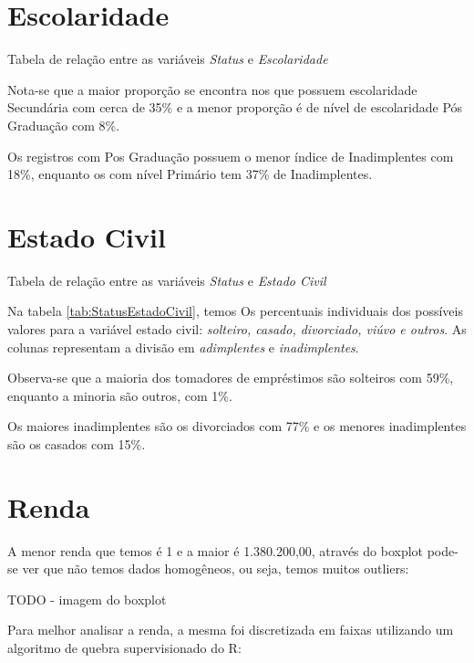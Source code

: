\section{Escolaridade}

\begin{table}[h]
\centering

\caption{\label{tab:StatusEscolaridade}Tabela de relação entre as variáveis \emph{Status
} e \emph{Escolaridade}}
\end{table}

Nota-se que a maior proporção se encontra nos que possuem escolaridade
Secundária com cerca de 35\% e a menor proporção é de nível de escolaridade
Pós Graduação com 8\%.

Os registros com Pos Graduação possuem o menor índice de Inadimplentes
com 18\%, enquanto os com nível Primário tem 37\% de Inadimplentes.

\section{Estado Civil}

\begin{table}[h]
\centering

\caption{\label{tab:StatusEstadoCivil}Tabela de relação entre as variáveis \emph{Status
}e \emph{Estado Civil}}
\end{table}

Na tabela \ref{tab:StatusEstadoCivil}, temos Os percentuais individuais dos possíveis valores para a variável estado civil: \emph{solteiro, casado, divorciado, viúvo e outros}. As colunas representam a divisão em \emph{adimplentes} e \emph{inadimplentes}.

Observa-se que a maioria dos tomadores de empréstimos são solteiros com 59\%, enquanto a minoria são outros, com 1\%.

Os maiores inadimplentes são os divorciados com 77\% e os menores inadimplentes são os casados com 15\%.

\section{Renda}

A menor renda que temos é 1 e a maior é 1.380.200,00, através do boxplot
pode-se ver que não temos dados homogêneos, ou seja, temos muitos
outliers:

TODO - imagem do boxplot

Para melhor analisar a renda, a mesma foi discretizada em faixas utilizando
um algoritmo de quebra supervisionado do R:

